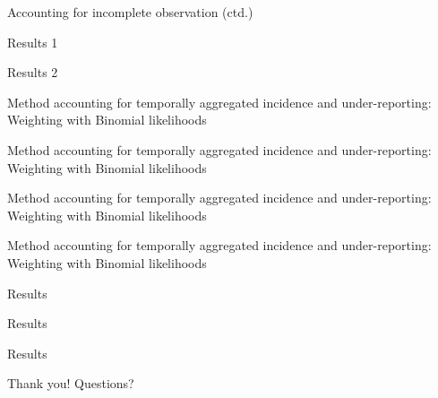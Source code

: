 \documentclass[
  ignorenonframetext,
]{beamer}
\begin{document}
\begin{frame}{Accounting for incomplete observation (ctd.)}
\protect\hypertarget{accounting-for-incomplete-observation-ctd.}{}
\end{frame}


\begin{frame}{Results 1}
\protect\hypertarget{results-1}{}
\end{frame}

\begin{frame}{Results 2}
\protect\hypertarget{results-2}{}
\end{frame}

\begin{frame}{Method accounting for temporally aggregated incidence and
under-reporting: Weighting with Binomial likelihoods}
\protect\hypertarget{method-accounting-for-temporally-aggregated-incidence-and-under-reporting-weighting-with-binomial-likelihoods}{}
\end{frame}

\begin{frame}{Method accounting for temporally aggregated incidence and
under-reporting: Weighting with Binomial likelihoods}
\protect\hypertarget{method-accounting-for-temporally-aggregated-incidence-and-under-reporting-weighting-with-binomial-likelihoods-1}{}
\end{frame}

\begin{frame}{Method accounting for temporally aggregated incidence and
under-reporting: Weighting with Binomial likelihoods}
\protect\hypertarget{method-accounting-for-temporally-aggregated-incidence-and-under-reporting-weighting-with-binomial-likelihoods-2}{}
\end{frame}

\begin{frame}{Method accounting for temporally aggregated incidence and
under-reporting: Weighting with Binomial likelihoods}
\protect\hypertarget{method-accounting-for-temporally-aggregated-incidence-and-under-reporting-weighting-with-binomial-likelihoods-3}{}
\end{frame}

\begin{frame}{Results}
\protect\hypertarget{results}{}
\end{frame}

\begin{frame}{Results}
\protect\hypertarget{results-3}{}
\end{frame}

\begin{frame}{Results}
\protect\hypertarget{results-4}{}
\end{frame}

\begin{frame}{Thank you!}
\protect\hypertarget{thank-you}{}
Questions?
\end{frame}
\end{document}

